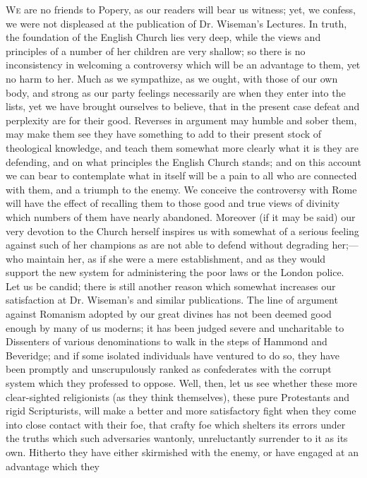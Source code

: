 W\textsc{e}
are no friends to Popery, as our readers will bear us witness; yet, we
confess, we were not displeased at the publication of Dr. Wiseman's
Lectures. In truth, the foundation of the English Church lies very deep,
while the views and principles of a number of her children are very
shallow; so there is no inconsistency in welcoming a controversy which
will be an advantage to them, yet no harm to her. Much as we sympathize,
as we ought, with those of our own body, and strong as our party
feelings necessarily are when they enter into the lists, yet we have
brought ourselves to believe, that in the present case defeat and
perplexity are for their good. Reverses in argument may humble and sober
them, may make them see they have something to add to their present
stock of theological knowledge, and teach them somewhat more clearly
what it is they are defending, and on what principles the English Church
stands; and on this account we can bear to contemplate what in itself
will be a pain to all who are connected with them, and a triumph to the
enemy. We conceive the controversy with Rome will have the effect of
recalling them to those good and true views of divinity which numbers of
them have nearly abandoned. Moreover (if it may be said) our very
devotion to the Church herself inspires us with somewhat of a serious
feeling against such of her champions as are not able to defend without
degrading her;—who maintain her, as if she were a mere establishment,
and as they would support the new system for administering the poor laws
or the London police. Let us be candid; there is still another reason
which somewhat
increases our satisfaction at Dr. Wiseman's and similar publications.
The line of argument against Romanism adopted by our great divines has
not been deemed good enough by many of us moderns; it has been judged
severe and uncharitable to Dissenters of various denominations to walk
in the steps of Hammond and Beveridge; and if some isolated individuals
have ventured to do so, they have been promptly and unscrupulously
ranked as confederates with the corrupt system which they professed to
oppose. Well, then, let us see whether these more clear-sighted
religionists (as they think themselves), these pure Protestants and
rigid Scripturists, will make a better and more satisfactory fight when
they come into close contact with their foe, that crafty foe which
shelters its errors under the truths which such adversaries wantonly,
unreluctantly surrender to it as its own. Hitherto they have either
skirmished with the enemy, or have engaged at an advantage which they
